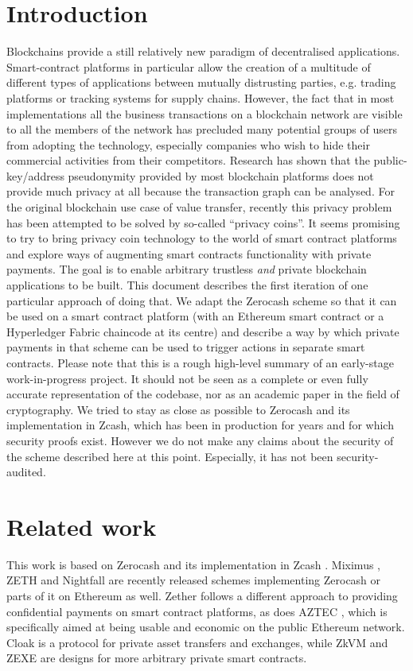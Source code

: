 \documentclass{article}
\begin{document}
\section{Introduction}
Blockchains provide a still relatively new paradigm of decentralised applications. Smart-contract platforms in particular allow the creation of a multitude of different types of applications between mutually distrusting parties, e.g. trading platforms or tracking systems for supply chains. However, the fact that in most implementations all the business transactions on a blockchain network are visible to all the members of the network has precluded many potential groups of users from adopting the technology, especially companies who wish to hide their commercial activities from their competitors. Research has shown that the public-key/address pseudonymity provided by most blockchain platforms does not provide much privacy at all because the transaction graph can be analysed. For the original blockchain use case of value transfer, recently this privacy problem has been attempted to be solved by so-called ``privacy coins''. It seems promising to try to bring privacy coin technology to the world of smart contract platforms and explore ways of augmenting smart contracts functionality with private payments. The goal is to enable arbitrary trustless \textit{and} private blockchain applications to be built. This document describes the first iteration of one particular approach of doing that. We adapt the Zerocash scheme so that it can be used on a smart contract platform (with an Ethereum smart contract or a Hyperledger Fabric chaincode at its centre) and describe a way by which private payments in that scheme can be used to trigger actions in separate smart contracts. Please note that this is a rough high-level summary of an early-stage work-in-progress project. It should not be seen as a complete or even fully accurate representation of the codebase, nor as an academic paper in the field of cryptography. We tried to stay as close as possible to Zerocash and its implementation in Zcash, which has been in production for years and for which security proofs exist. However we do not make any claims about the security of the scheme described here at this point. Especially, it has not been security-audited.

\pagebreak

\section{Related work}
This work is based on Zerocash \cite{zerocash} and its implementation in Zcash \cite{zcash}. Miximus \cite{miximus}, ZETH \cite{zeth} and Nightfall \cite{nightfall} are recently released schemes implementing Zerocash or parts of it on Ethereum as well. Zether \cite{zether} follows a different approach to providing confidential payments on smart contract platforms, as does AZTEC \cite{aztec}, which is specifically aimed at being usable and economic on the public Ethereum network. Cloak \cite{cloak} is a protocol for private asset transfers and exchanges, while ZkVM \cite{zkvm} and ZEXE \cite{zexe} are designs for more arbitrary private smart contracts.
\end{document}
